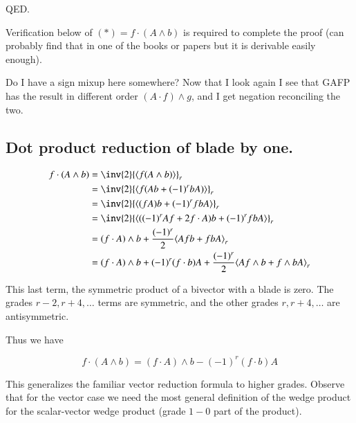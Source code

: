 \documentclass{article}
\newcommand{\gpgrade}[2] {{\left\langle{{#1}}\right\rangle}_{#2}}
\begin{document}
QED.

Verification below of $(*) = f \cdot (A \wedge b)$ is required to complete the proof (can probably find that in one of the books or papers but it is derivable
easily enough).

Do I have a sign mixup here somewhere?  Now that I look again I see that GAFP
has the result in different order $(A \cdot f) \wedge g$, and I get negation
reconciling the two.

\subsection{ Dot product reduction of blade by one. }

\begin{align*}
f \cdot (A \wedge b)
&= \inv{2} \gpgrade{f (A \wedge b)}{r} \\
&= \inv{2} \gpgrade{f (A b + (-1)^r b A)}{r} \\
&= \inv{2} \gpgrade{(f A) b + (-1)^r f b A}{r} \\
&= \inv{2} \gpgrade{((-1)^r A f + 2 f \cdot A) b + (-1)^r f b A}{r} \\
&= (f \cdot A) \wedge b + \frac{(-1)^r}{2} \gpgrade{A f b + f b A}{r} \\
&= (f \cdot A) \wedge b + (-1)^r (f \cdot b) A
+ \frac{(-1)^r}{2} \gpgrade{A f \wedge b + f \wedge b A}{r} \\
\end{align*}

This last term, the symmetric product of a bivector with a blade is zero.
The grades $r-2, r+4, \ldots$ terms are symmetric, and the other grades
$r, r+4, \ldots$ are antisymmetric.

Thus we have

\begin{equation}
f \cdot (A \wedge b)
= (f \cdot A) \wedge b - (-1)^r (f \cdot b) A
\end{equation}

This generalizes the familiar vector reduction formula to higher grades.
Observe that for the vector case we need the most general definition
of the wedge product for the scalar-vector wedge product (grade $1-0$ part of the product).

\end{document}
